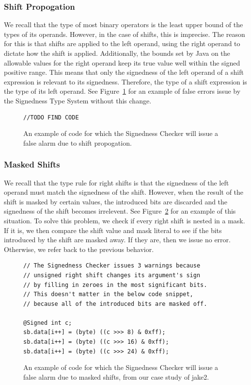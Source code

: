 \subsubsection{Shift Propogation}
We recall that the type of most binary operators is the least upper bound of
the types of its operands.
However, in the case of shifts, this is imprecise.
The reason for this is that shifts are applied to the left operand, using the
right operand to dictate how the shift is applied. Additionally, the bounds
set by Java on the allowable values for the right operand keep its true value
well within the signed positive range. This means that only the signedness
of the left operand of a shift expression is relevant to its signedness.
Therefore, the type of a shift expression is the type of its left operand. See
Figure~\ref{fig:shiftpropo} for an example of false errors issue by the
Signedness Type System without this change.

\begin{figure}[t]
\begin{lstlisting}
//TODO FIND CODE
\end{lstlisting}
\vspace{-10pt}
\caption{An example of code for which the Signedness Checker will issue a false
alarm due to shift propogation.}
\label{fig:shiftpropo}
\end{figure}

\subsubsection{Masked Shifts}
We recall that the type rule for right shifts is that the signedness of the left
operand must match the signedness of the shift. However, when the result of the
shift is masked by certain values, the introduced bits are discarded and the
signedness of the shift becomes irrelevent. See Figure~\ref{fig:maskedshift}
for an example of this situation. To solve this problem, we check if every
right shift is nested in a mask. If it is, we then compare the shift value
and mask literal to see if the bits introduced by the shift are masked away.
If they are, then we issue no error. Otherwise, we refer back to the previous
behavior.

\begin{figure}[t]
\begin{lstlisting}
// The Signedness Checker issues 3 warnings because
// unsigned right shift changes its argument's sign
// by filling in zeroes in the most significant bits.
// This doesn't matter in the below code snippet,
// because all of the introduced bits are masked off.

@Signed int c;
sb.data[i++] = (byte) ((c >>> 8) & 0xff);
sb.data[i++] = (byte) ((c >>> 16) & 0xff);
sb.data[i++] = (byte) ((c >>> 24) & 0xff);

\end{lstlisting}
\vspace{-10pt}
\caption{An example of code for which the Signedness Checker will issue a false
alarm due to masked shifts, from our case study of jake2.}
\label{fig:maskedshift}
\end{figure}

